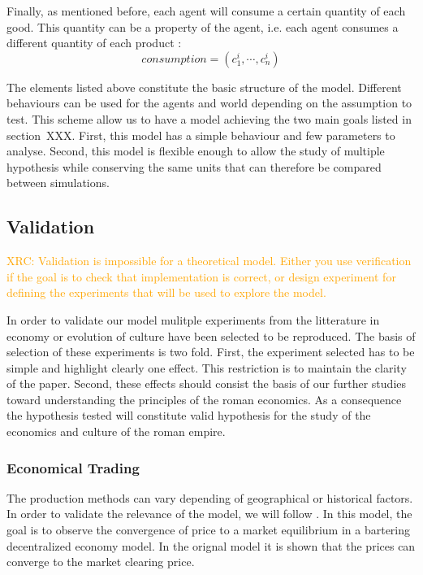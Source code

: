 \documentclass{wscpaperproc}
\newcommand{\memo}[2]{\textcolor{#1}{#2}}
\newcommand{\xrc}[1]{\memo{orange}{XRC: #1\\}}
\begin{document}


 
Finally, as mentioned before, each agent will consume a certain quantity of each good. This quantity can be a property of the agent, i.e. each agent consumes a different quantity of each product :
$$ consumption = (c^i_1, \cdots, c^i_n) $$ 

The elements listed above constitute the basic structure of the model. Different behaviours can be used for the agents and world depending on the assumption to test. This scheme allow us to have a model achieving the two main goals listed in section~XXX. First, this model has a simple behaviour and few parameters to analyse. Second, this model is flexible enough to allow the study of multiple hypothesis while conserving the same units that can therefore be compared between simulations.


\subsection{Validation}
\xrc{Validation is impossible for a theoretical model. Either you use verification if the goal is to check that implementation is correct, or design experiment for defining the experiments that will be used to explore the model.}

In order to validate our model mulitple experiments from the litterature in economy or evolution of culture have been selected to be reproduced. The basis of selection of these experiments is two fold. First, the experiment selected has to be simple and highlight clearly one effect. This restriction is to maintain the clarity of the paper. Second, these effects should consist the basis of our further studies toward understanding the principles of the roman economics. As a consequence the hypothesis tested will constitute valid hypothesis for the study of the economics and culture of the roman empire.

\subsubsection{Economical Trading}\label{trade}

The production methods can vary depending of geographical or historical factors. In order to validate the relevance of the model, we will follow \cite{gintis_emergence_2006}. In this model, the goal is to observe the convergence of price to a market equilibrium in a bartering decentralized economy model. In the orignal model it is shown that the prices can converge to the market clearing price.
\end{document}
